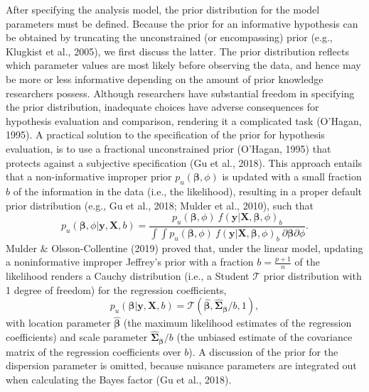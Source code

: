 \documentclass[
]{interact}
\begin{document}
After specifying the analysis model, the prior distribution for the
model parameters must be defined. Because the prior for an informative
hypothesis can be obtained by truncating the unconstrained (or
encompassing) prior (e.g., Klugkist et al., 2005), we first discuss the
latter. The prior distribution reflects which parameter values are most
likely before observing the data, and hence may be more or less
informative depending on the amount of prior knowledge researchers
possess. Although researchers have substantial freedom in specifying the
prior distribution, inadequate choices have adverse consequences for
hypothesis evaluation and comparison, rendering it a complicated task
(O'Hagan, 1995). A practical solution to the specification of the prior
for hypothesis evaluation, is to use a fractional unconstrained prior
(O'Hagan, 1995) that protects against a subjective specification (Gu et
al., 2018). This approach entails that a non-informative improper prior
\(p_u(\boldsymbol{\beta}, \phi)\) is updated with a small fraction \(b\)
of the information in the data (i.e., the likelihood), resulting in a
proper default prior distribution (e.g., Gu et al., 2018; Mulder et al.,
2010), such that \[
p_u(\boldsymbol{\beta}, \phi|\boldsymbol{y}, \boldsymbol{X}, b) = 
\frac{
  p_u(\boldsymbol{\beta}, \phi) ~ f(\boldsymbol{y}|\boldsymbol{X}, \boldsymbol{\beta}, \phi)_b
}{
  \int \int p_u(\boldsymbol{\beta}, \phi) ~ 
  f(\boldsymbol{y}|\boldsymbol{X}, \boldsymbol{\beta}, \phi)_b ~ 
  \partial \boldsymbol{\beta} \partial \phi
}.
\] Mulder \& Olsson-Collentine (2019) proved that, under the linear
model, updating a noninformative improper Jeffrey's prior with a
fraction \(b = \frac{p+1}{n}\) of the likelihood renders a Cauchy
distribution (i.e., a Student \(\mathcal{T}\) prior distribution with 1
degree of freedom) for the regression coefficients, \[
p_u(\boldsymbol{\beta} | \boldsymbol{y}, \boldsymbol{X}, b) = 
\mathcal{T}(\boldsymbol{\hat{\beta}}, \boldsymbol{\hat{\Sigma}_\beta} / b, 1),
\] with location parameter \(\boldsymbol{\hat{\beta}}\) (the maximum
likelihood estimates of the regression coefficients) and scale parameter
\(\boldsymbol{\hat{\Sigma}_{\beta}} / b\) (the unbiased estimate of the
covariance matrix of the regression coefficients over \(b\)). A
discussion of the prior for the dispersion parameter is omitted, because
nuisance parameters are integrated out when calculating the Bayes factor
(Gu et al., 2018).
\end{document}
